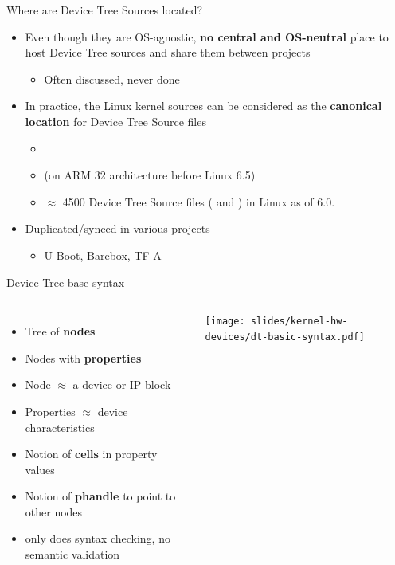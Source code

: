 \begin{frame}{Where are Device Tree Sources located?}
  \begin{itemize}
  \item Even though they are OS-agnostic, {\bf no central and
      OS-neutral} place to host Device Tree sources and share them
    between projects
    \begin{itemize}
    \item Often discussed, never done
    \end{itemize}
  \item In practice, the Linux kernel sources can be considered as the
    {\bf canonical location} for Device Tree Source files
    \begin{itemize}
    \item {}
    \item {} (on ARM 32 architecture before Linux 6.5)
    \item $\approx$ 4500 Device Tree Source files ( and
          ) in Linux as of 6.0.
    \end{itemize}
  \item Duplicated/synced in various projects
    \begin{itemize}
    \item U-Boot, Barebox, TF-A
    \end{itemize}
  \end{itemize}
\end{frame}

\begin{frame}{Device Tree base syntax}
  \begin{columns}
    \begin{itemize}
    \item Tree of {\bf nodes}
    \item Nodes with {\bf properties}
    \item Node $\approx$ a device or IP block
    \item Properties $\approx$ device characteristics
    \item Notion of {\bf cells} in property values
    \item Notion of {\bf phandle} to point to other nodes
    \item {} only does syntax checking, no semantic validation
    \end{itemize}
    \begin{center}
      \texttt{[image: slides/kernel-hw-devices/dt-basic-syntax.pdf]}
    \end{center}
  \end{columns}
\end{frame}

